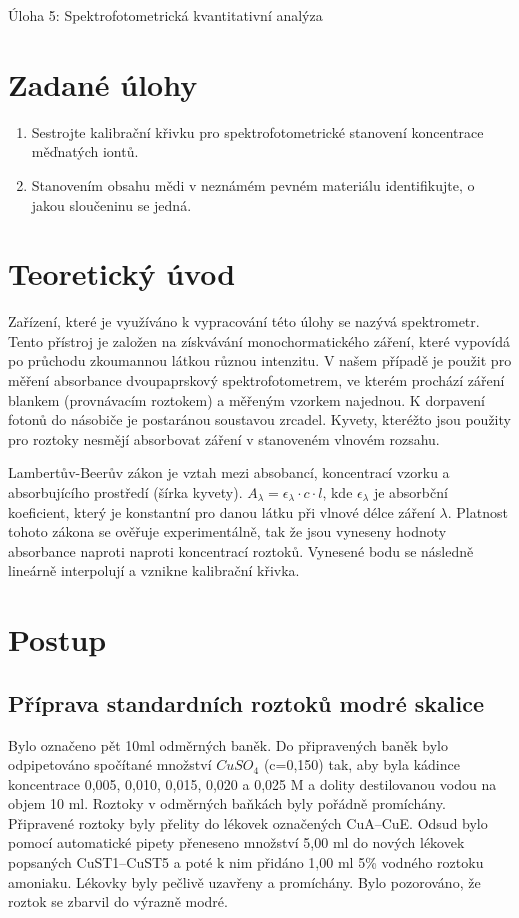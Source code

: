 \documentclass[13pt, a4paper, twoside]{article}
\begin{document}
    \begin{center}
        \Huge
        Úloha 5: Spektrofotometrická kvantitativní analýza
    \end{center}
    \onehalfspacing \large
    \section*{Zadané úlohy}
    \begin{enumerate}
        \item Sestrojte kalibrační křivku pro spektrofotometrické stanovení koncentrace měďnatých
        iontů.
        \item Stanovením obsahu mědi v neznámém pevném materiálu identifikujte, o jakou sloučeninu
        se jedná.
    \end{enumerate}
    \section*{Teoretický úvod}
    Zařízení, které je využíváno k vypracování této úlohy se nazývá spektrometr.
    Tento přístroj je založen na získvávání monochormatického záření, které vypovídá
    po průchodu zkoumannou látkou různou intenzitu. V našem případě je použit pro
    měření absorbance dvoupaprskový spektrofotometrem, ve kterém prochází záření blankem
    (provnávacím roztokem) a měřeným vzorkem najednou. K dorpavení fotonů do násobiče
    je postaránou soustavou zrcadel. Kyvety, kteréžto jsou použity pro roztoky nesmějí
    absorbovat záření v stanoveném vlnovém rozsahu.


    Lambertův-Beerův zákon je vztah mezi absobancí, koncentrací vzorku a absorbujícího prostředí
    (šírka kyvety). $A_{\lambda}=\epsilon_{\lambda} \cdot c \cdot l$, kde $\epsilon_{\lambda}$
    je absorbční koeficient, který je konstantní pro danou látku při vlnové délce záření $\lambda$.
    Platnost tohoto zákona se ověřuje experimentálně, tak že jsou vyneseny hodnoty absorbance naproti
    naproti koncentrací roztoků. Vynesené bodu se následně lineárně interpolují a vznikne kalibrační křivka.

    

    \section*{Postup}
    \subsection*{Příprava standardních roztoků modré skalice}
    Bylo označeno pět 10ml odměrných baněk. Do připravených baněk bylo odpipetováno 
    spočítané množství $CuSO_4$ (c=0,150) tak, aby byla kádince koncentrace 0,005, 0,010,
    0,015, 0,020 a 0,025 M a dolity destilovanou vodou na objem 10 ml. Roztoky v odměrných 
    baňkách byly pořádně promíchány. Připravené roztoky byly přelity do lékovek označených 
    CuA–CuE. Odsud bylo pomocí automatické pipety přeneseno množství 5,00 ml do nových
    lékovek popsaných CuST1–CuST5 a poté k nim přidáno 1,00 ml 5\% vodného roztoku
    amoniaku. Lékovky byly pečlivě uzavřeny a promíchány. Bylo pozorováno, že roztok se zbarvil do výrazně modré. 
\end{document}
